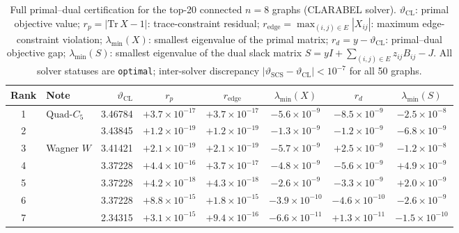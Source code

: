 \documentclass[aps,pra,twocolumn,superscriptaddress,longbibliography,floatfix]{revtex4-2}
\newcommand{\vt}{\vartheta}
\newcommand{\lmin}{\lambda_{\min}}
\newcommand{\QC}{\ensuremath{\text{Quad-}C_5}}
\begin{document}
\begin{table}[!t]
  \caption{Full primal--dual certification for the top-20 connected $n=8$
           graphs (CLARABEL solver).
           $\vt_\text{CL}$: primal objective value;
           $r_p = |\mathrm{Tr}\,X-1|$: trace-constraint residual;
           $r_\text{edge} = \max_{(i,j)\in E}|X_{ij}|$: maximum
           edge-constraint violation;
           $\lmin(X)$: smallest eigenvalue of the primal matrix;
           $r_d = y - \vt_\text{CL}$: primal--dual objective gap;
           $\lmin(S)$: smallest eigenvalue of the dual slack matrix
           $S = yI + \sum_{(i,j)\in E} z_{ij} B_{ij} - J$.
           All solver statuses are \texttt{optimal};
           inter-solver discrepancy
           $|\vt_\text{SCS}-\vt_\text{CL}|<10^{-7}$ for all 50 graphs.}
  \label{tab:certification}
  \begin{ruledtabular}
  \scriptsize
  \begin{tabular}{clrccccc}
    Rank & Note &
    $\vt_\text{CL}$ &
    \multicolumn{1}{c}{$r_p$} &
    \multicolumn{1}{c}{$r_\text{edge}$} &
    \multicolumn{1}{c}{$\lmin(X)$} &
    \multicolumn{1}{c}{$r_d$} &
    \multicolumn{1}{c}{$\lmin(S)$} \\
    \hline
     1 & \QC\          & 3.46784 & $+3.7\!\times\!10^{-17}$ & $+3.7\!\times\!10^{-17}$ & $-5.6\!\times\!10^{-9}$ & $-8.5\!\times\!10^{-9}$ & $-2.5\!\times\!10^{-8}$ \\
     2 &              & 3.43845 & $+1.2\!\times\!10^{-19}$ & $+1.2\!\times\!10^{-19}$ & $-1.3\!\times\!10^{-9}$ & $-1.2\!\times\!10^{-9}$ & $-6.8\!\times\!10^{-9}$ \\
     3 & Wagner $W$   & 3.41421 & $+2.1\!\times\!10^{-19}$ & $+2.1\!\times\!10^{-19}$ & $-5.7\!\times\!10^{-9}$ & $+2.5\!\times\!10^{-9}$ & $-1.2\!\times\!10^{-8}$ \\
     4 &              & 3.37228 & $+4.4\!\times\!10^{-16}$ & $+3.7\!\times\!10^{-17}$ & $-4.8\!\times\!10^{-9}$ & $-5.6\!\times\!10^{-9}$ & $+4.9\!\times\!10^{-9}$ \\
     5 &              & 3.37228 & $+4.2\!\times\!10^{-18}$ & $+4.3\!\times\!10^{-18}$ & $-2.6\!\times\!10^{-9}$ & $-3.3\!\times\!10^{-9}$ & $+2.0\!\times\!10^{-9}$ \\
     6 &              & 3.37228 & $+8.8\!\times\!10^{-15}$ & $+1.8\!\times\!10^{-15}$ & $-3.9\!\times\!10^{-10}$ & $-4.6\!\times\!10^{-10}$ & $-2.6\!\times\!10^{-9}$ \\
     7 &              & 2.34315 & $+3.1\!\times\!10^{-15}$ & $+9.4\!\times\!10^{-16}$ & $-6.6\!\times\!10^{-11}$ & $+1.3\!\times\!10^{-11}$ & $-1.5\!\times\!10^{-10}$ \\

\end{tabular}
\end{ruledtabular}
\end{table}
\end{document}

